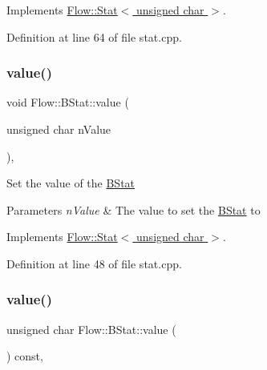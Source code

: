 Implements \hyperlink{class_flow_1_1_stat_a7cf2be39e64fb4da988b604b92a85d28}{Flow\+::\+Stat$<$ unsigned char $>$}.



Definition at line 64 of file stat.\+cpp.

\hypertarget{class_flow_1_1_b_stat_a65299c411a0e8767b6715557de1cbf23}{}\label{class_flow_1_1_b_stat_a65299c411a0e8767b6715557de1cbf23} 
\subsubsection{\texorpdfstring{value()}{value()}\hspace{0.1cm}{\footnotesize\ttfamily [1/2]}}
{\footnotesize\ttfamily void Flow\+::\+B\+Stat\+::value (\begin{DoxyParamCaption}\item[{unsigned char}]{n\+Value }\end{DoxyParamCaption})\hspace{0.3cm}{\ttfamily [override]}, {\ttfamily [virtual]}}

Set the value of the \hyperlink{class_flow_1_1_b_stat}{B\+Stat} 
\begin{DoxyParams}{Parameters}
{\em n\+Value} & The value to set the \hyperlink{class_flow_1_1_b_stat}{B\+Stat} to \\
\hline
\end{DoxyParams}


Implements \hyperlink{class_flow_1_1_stat_ab28bdb79f7d6444f1e341a62ef039b96}{Flow\+::\+Stat$<$ unsigned char $>$}.



Definition at line 48 of file stat.\+cpp.

\hypertarget{class_flow_1_1_b_stat_aafd9dbf4e02e6fbfc3bc3dfb572496dc}{}\label{class_flow_1_1_b_stat_aafd9dbf4e02e6fbfc3bc3dfb572496dc} 
\subsubsection{\texorpdfstring{value()}{value()}\hspace{0.1cm}{\footnotesize\ttfamily [2/2]}}
{\footnotesize\ttfamily unsigned char Flow\+::\+B\+Stat\+::value (\begin{DoxyParamCaption}{ }\end{DoxyParamCaption}) const\hspace{0.3cm}{\ttfamily [override]}, {\ttfamily [virtual]}}

